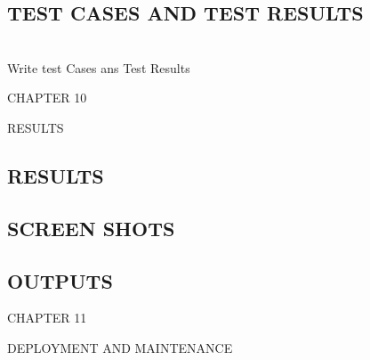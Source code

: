 \documentclass[12pt,a4paper]
{article}
\numberwithin{table}{section}
\begin{document}
{{{{{{{{\subsection{TEST CASES AND TEST RESULTS}
\\
Write test Cases ans Test Results
\newpage
\begin{minipage}{15cm}


\vspace{4 in}
 \begin{center} 
\begin{Huge}
CHAPTER 10

\vspace{0.5 in}

RESULTS
\end{Huge}

\end{center}
\end{minipage}

\newpage
\begin{center}
\section{RESULTS}
\end{center}

\subsection{SCREEN SHOTS}

\subsection{OUTPUTS}



\newpage
\begin{minipage}{15cm}


\vspace{4 in}
 \begin{center} 
\begin{Huge}
CHAPTER 11

\vspace{0.5 in}

DEPLOYMENT AND MAINTENANCE
\end{Huge}

\end{center}
\end{minipage}

\newpage
\begin{center}

\end{center}}}}}}}}}
\end{document}
